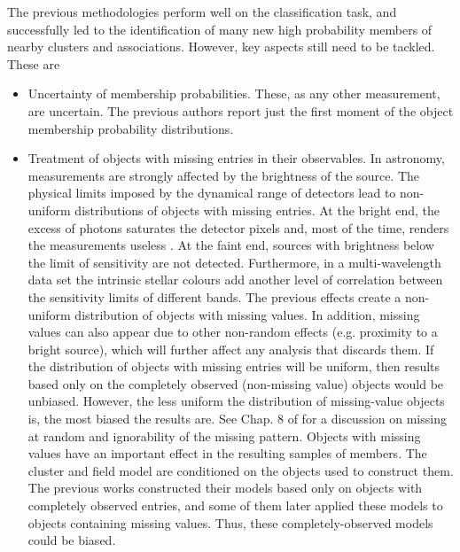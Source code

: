 The previous methodologies perform well on the classification task, and successfully led to the identification of many new high probability members of nearby clusters and associations. However, key aspects still need to be tackled. These are 
\begin{itemize}
\item Uncertainty of membership probabilities. These, as any other measurement, are uncertain. The previous authors report just the first moment of the object membership probability distributions.
\item Treatment of objects with missing entries in their observables. In astronomy, measurements are strongly affected by the brightness of the source. The physical limits imposed by the dynamical range of detectors lead to non-uniform distributions of objects with missing entries. At the bright end, the excess of photons saturates the detector pixels and, most of the time, renders the measurements useless \cite[however, see][ for examples of high-precision astrometry and photometry on saturated images]{2003hstc.conf..346M,2013AJ....146..106O}.  At the faint end, sources with brightness below the limit of sensitivity are not detected. Furthermore, in a multi-wavelength data set the intrinsic stellar colours add another level of correlation between the sensitivity limits of different bands. The previous effects create a non-uniform distribution of objects with missing values. In addition, missing values can also appear due to other non-random effects (e.g. proximity to a bright source), which will further affect any analysis that discards them. If the distribution of objects with missing entries will be uniform, then results based only on the completely observed (non-missing value) objects would be unbiased. However, the less uniform the distribution of missing-value objects is, the most biased the results are. See Chap. 8 of \citet{Gelman2013} for a discussion on missing at random and ignorability of the missing pattern. Objects with missing values have an important effect in the resulting samples of members. The cluster and field model are conditioned on the objects used to construct them. The previous works constructed their models based only on objects with completely observed entries, and some of them later applied these models to objects containing missing values.  Thus, these completely-observed models could be biased.


\end{itemize}
